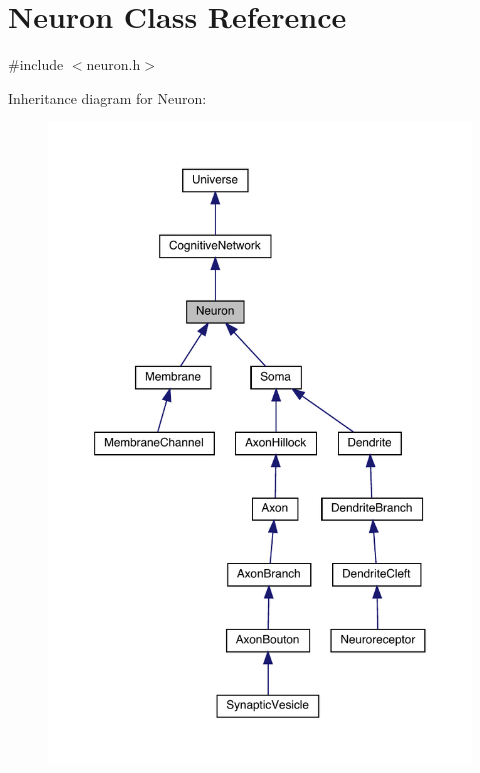 \hypertarget{class_neuron}{}\section{Neuron Class Reference}
\label{class_neuron}


{\ttfamily \#include $<$neuron.\+h$>$}



Inheritance diagram for Neuron\+:\nopagebreak
\begin{figure}[H]
\begin{center}
\leavevmode
\includegraphics[width=350pt]{class_neuron__inherit__graph}
\end{center}
\end{figure}


